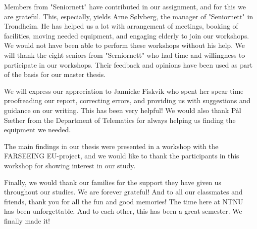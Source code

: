 \documentclass[b5paper,11pt,openright,twoside]{report}
\begin{document}
Members from "Seniornett" have contributed in our assignment, and for this we are grateful. This, especially, yields Arne Sølvberg, the manager of "Seniornett" in Trondheim. He has helped us a lot with arrangement of meetings, booking of facilities, moving needed equipment, and engaging elderly to join our workshops. We would not have been able to perform these workshops without his help. We will thank the eight seniors from "Serniornett" who had time and willingness to participate in our workshops. Their feedback and opinions have been used as part of the basis for our master thesis. 

We will express our appreciation to Jannicke Fiskvik who spent her spear time proofreading our report, correcting errors, and providing us with suggestions and guidance on our writing. This has been very helpful! We would also thank Pål Sæther from the Department of Telematics for always helping us finding the equipment we needed. 

The main findings in our thesis were presented in a workshop with the FARSEEING EU-project, and we would like to thank the participants in this workshop for showing interest in our study. 

Finally, we would thank our families for the support they have given us throughout our studies. We are forever grateful! And to all our classmates and friends, thank you for all the fun and good memories! The time here at NTNU has been unforgettable. And to each other, this has been a great semester. We finally made it!   

\cleardoublepage
{}
\tableofcontents
\cleardoublepage

\cleardoublepage
\listoffigures
\cleardoublepage
\listoftables
\cleardoublepage
{}
\pagestyle{fancy}
\fancyhead[LE]{\thepage}
\fancyhead[RE]{\leftmark}
\fancyhead[RO]{\thepage}
\fancyhead[LO]{\rightmark}
\fancyfoot{}
\cleardoublepage

\cleardoublepage

\cleardoublepage

\cleardoublepage

\cleardoublepage

\cleardoublepage

\cleardoublepage

\cleardoublepage

\cleardoublepage

\cleardoublepage

\cleardoublepage

\cleardoublepage

\cleardoublepage

\cleardoublepage


\pagestyle{plain}
\cleardoublepage
\appendix 
  
\cleardoublepage
\end{document}
